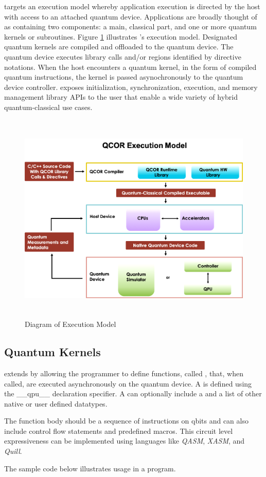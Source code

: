 \qcor targets an execution model whereby application execution is directed by the host with access to an attached quantum device. Applications are broadly thought of as containing two components: a main, classical part, and one or more quantum kernels or subroutines. Figure \ref{fig:exec_model} illustrates \qcor's execution model. Designated quantum kernels are compiled and offloaded to the quantum device. The quantum device executes \qcor library calls and/or \qcor regions identified by directive notations. When the host encounters a quantum kernel, in the form of compiled quantum instructions, the kernel is passed asynochronously to the quantum device controller.
\qcor exposes initialization, synchronization, execution, and memory management library \ac{API}s to the user that enable a wide variety of hybrid quantum-classical use cases.

\begin{figure}
 \centering
 \includegraphics[width=5in,height=4in]{figures/Execution_Model_Illustration_v3.png}
  \caption{Diagram of \qcor Execution Model}
  \label{fig:exec_model}
\end{figure}


\subsection{\textbf{Quantum Kernels}}\label{subsec:kernel}
\qcor extends \CorCpp by allowing the programmer to define functions, called , that, when called, are executed asynchronously on the quantum device. A  is defined using the __qpu__ declaration specifier. A  can optionally include a \qcor {} and a list of other native or user defined \CorCpp datatypes.

The  function body should be a sequence of instructions on qbits and can also include control flow statements and predefined macros.  This circuit level expressiveness can be implemented using languages like \textit{QASM}, \textit{XASM}, and \textit{Quill}. 

The sample code below illustrates  usage in a \CorCpp program.

